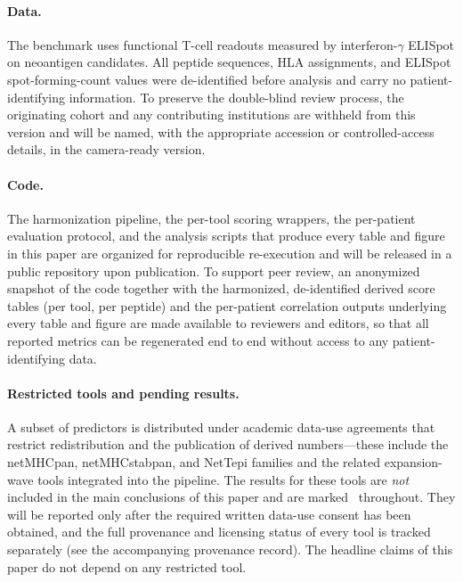 \paragraph{Data.} The benchmark uses functional T-cell readouts measured by
interferon-$\gamma$ ELISpot on neoantigen candidates. All peptide sequences,
HLA assignments, and ELISpot spot-forming-count values were de-identified before
analysis and carry no patient-identifying information. To preserve the
double-blind review process, the originating cohort and any contributing
institutions are withheld from this version and will be named, with the
appropriate accession or controlled-access details, in the camera-ready version.

\paragraph{Code.} The harmonization pipeline, the per-tool scoring wrappers, the
per-patient evaluation protocol, and the analysis scripts that produce every
table and figure in this paper are organized for reproducible re-execution and
will be released in a public repository upon publication. To support peer review,
an anonymized snapshot of the code together with the harmonized, de-identified
derived score tables (per tool, per peptide) and the per-patient correlation
outputs underlying every table and figure are made available to reviewers and
editors, so that all reported metrics can be regenerated end to end without access
to any patient-identifying data.

\paragraph{Restricted tools and pending results.} A subset of predictors is
distributed under academic data-use agreements that restrict redistribution and
the publication of derived numbers---these include the netMHCpan, netMHCstabpan,
and NetTepi families and the related expansion-wave tools integrated into the
pipeline. The results for these tools are \emph{not} included in the main
conclusions of this paper and are marked \pendingDTU\ throughout. They will be
reported only after the required written data-use consent has been obtained, and
the full provenance and licensing status of every tool is tracked separately
(see the accompanying provenance record). The headline claims of this paper do
not depend on any restricted tool.
